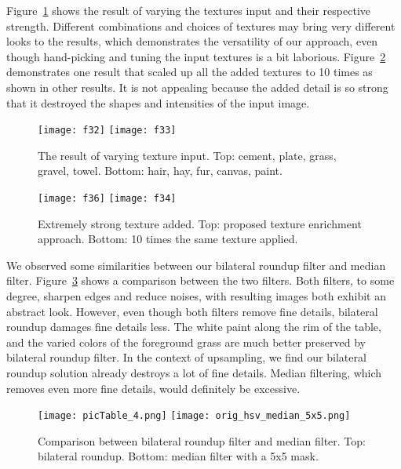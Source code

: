Figure~\ref{fig:textureVaried} shows the result of varying the textures input and their respective strength. Different combinations and choices of textures may bring very different looks to the results, which demonstrates the versatility of our approach, even though hand-picking and tuning the input textures is a bit laborious. Figure~\ref{fig:textureExtreme} demonstrates one result that scaled up all the added textures to 10 times as shown in other results. It is not appealing because the added detail is so strong that it destroyed the shapes and intensities of the input image. 

\begin{figure}[htbp]\centering
\texttt{[image: f32]}\vspace{1.1mm}
\texttt{[image: f33]}
\caption{The result of varying texture input. Top: cement, plate, grass, gravel, towel. Bottom: hair, hay, fur, canvas, paint. }
\label{fig:textureVaried}
\end{figure}

\begin{figure}[htbp]\centering
\texttt{[image: f36]}\vspace{1.1mm}
\texttt{[image: f34]}
\caption{Extremely strong texture added. Top: proposed texture enrichment approach. Bottom: 10 times the same texture applied. }
\label{fig:textureExtreme}
\end{figure}

We observed some similarities between our bilateral roundup filter and median filter. Figure~\ref{compwithMedian} shows a comparison between the two filters. Both filters, to some degree, sharpen edges and reduce noises, with resulting images both exhibit an abstract look. However, even though both filters remove fine details, bilateral roundup damages fine details less. The white paint along the rim of the table, and the varied colors of the foreground grass are much better preserved by bilateral roundup filter. In the context of upsampling, we find our bilateral roundup solution already destroys a lot of fine details. Median filtering, which removes even more fine details, would definitely be excessive. 

\begin{figure}[htbp]\centering
\texttt{[image: picTable\_4.png]}\vspace{1.1mm}
\texttt{[image: orig\_hsv\_median\_5x5.png]}
\caption{Comparison between bilateral roundup filter and median filter. Top: bilateral roundup. Bottom: median filter with a 5x5 mask. }
\label{compwithMedian}
\end{figure}

